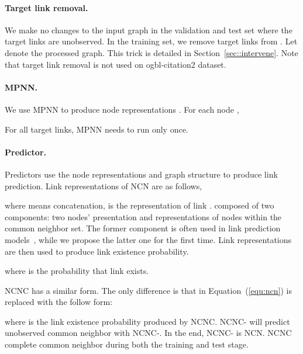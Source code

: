 \documentclass{article}
\theoremstyle{plain}
\theoremstyle{definition}
\theoremstyle{remark}
\begin{document}
\paragraph{Target link removal.} We make no changes to the input graph in the validation and test set where the target links are unobserved. In the training set, we remove target links from . Let  denote the processed graph. This trick is detailed in Section~\ref{sec::intervene}. Note that target link removal is not used on ogbl-citation2 dataset.

\paragraph{MPNN.} We use MPNN to produce node representations . For each node ,

For all target links, MPNN needs to run only once.

\paragraph{Predictor.}
Predictors use the node representations and graph structure to produce link prediction. Link representations of NCN are as follows,

where  means concatenation,  is the  representation of link .  composed of two components: two nodes' presentation  and representations of nodes within the common neighbor set. The former component is often used in link prediction models~\citep{GAE, Neo-GNN, Gsketch}, while we propose the latter one for the first time. Link representations are then used to produce link existence probability.

where  is the probability that link  exists. 

NCNC has a similar form. The only difference is that  in Equation~(\ref{equ:ncn}) is replaced with the follow form:

where  is the link existence probability produced by NCNC. NCNC- will predict unobserved common neighbor with NCNC-. In the end, NCNC- is NCN. NCNC complete common neighbor during both the training and test stage. 
\end{document}
